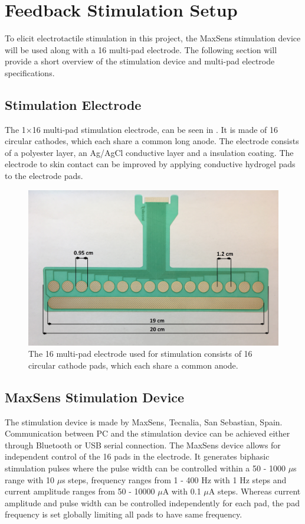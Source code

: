 \section{Feedback Stimulation Setup} \label{Maxxx}

To elicit electrotactile stimulation in this project, the MaxSens stimulation device will be used along with a 16 multi-pad electrode. The following section will provide a short overview of the stimulation device and multi-pad electrode specifications. 
 

\subsection{Stimulation Electrode}

The 1$\times$16 multi-pad stimulation electrode, can be seen in . It is made of 16 circular cathodes, which each share a common long anode. The electrode consists of a polyester layer, an Ag/AgCl conductive layer and a insulation coating. The electrode to skin contact can be improved by applying conductive hydrogel pads to the electrode pads. \cite{Strbac2016}     

\begin{figure}[H]                 
	\includegraphics[width=.57\textwidth]{figures/electrode}  
	\caption{The 16 multi-pad electrode used for stimulation consists of 16 circular cathode pads, which each share a common anode.}
	\label{fig:electrode} 
\end{figure}

\subsection{MaxSens Stimulation Device}

The stimulation device is made by MaxSens, Tecnalia, San Sebastian, Spain. Communication between PC and the stimulation device can be achieved either through Bluetooth or USB serial connection. The MaxSens device allows for independent control of the 16 pads in the electrode. It generates biphasic stimulation pulses where the pulse width can be controlled within a 50 - 1000 $\mu $s range with 10 $\mu $s steps, frequency ranges from 1 - 400 Hz with 1 Hz steps and current amplitude ranges from 50 - 10000 $\mu $A with 0.1 $\mu $A steps. Whereas current amplitude and pulse width can be controlled independently for each pad, the pad frequency is set globally limiting all pads to have same frequency.    